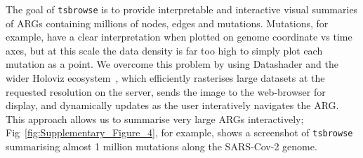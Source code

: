 \documentclass[unnumsec,webpdf,contemporary,large,namedate]{oup-authoring-template}%
\begin{document}
The goal of \texttt{tsbrowse} is to provide interpretable
and interactive visual summaries of ARGs containing millions of nodes, edges 
and mutations. Mutations, for example, have a clear interpretation
when plotted on genome coordinate vs time axes, but at this scale 
the data density is far too high to simply plot each mutation as a point.
We overcome this problem by using Datashader and the wider 
Holoviz ecosystem~\citep{Holoviz}, which efficiently rasterises large datasets
at the requested resolution on the server, sends the image to the web-browser
for display, and dynamically updates as the user interatively navigates the ARG.
This approach allows us to summarise very large ARGs interactively;
Fig~\ref{fig:Supplementary_Figure_4}, for example, shows a screenshot of 
\texttt{tsbrowse} summarising almost 1 million mutations along the SARS-Cov-2
genome.


\end{document}
